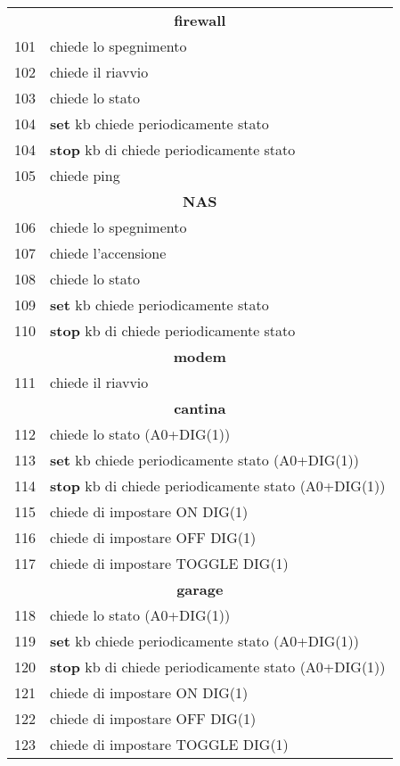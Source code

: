 \documentclass{article}
\begin{document}
    \begin{tabular}{ll}
        \multicolumn{2}{c}{\textbf{firewall}}\\
        101 & chiede lo spegnimento\\
        102 & chiede il riavvio\\
        103 & chiede lo stato\\
        104 & \textbf{set} kb chiede periodicamente stato\\
        104 & \textbf{stop} kb di chiede periodicamente stato\\
        105 & chiede ping\\
        \multicolumn{2}{c}{\textbf{NAS}}\\
        106 & chiede lo spegnimento\\
        107 & chiede l'accensione\\
        108 & chiede lo stato\\
        109 & \textbf{set} kb chiede periodicamente stato\\
        110 & \textbf{stop} kb di chiede periodicamente stato\\
        \multicolumn{2}{c}{\textbf{modem}}\\
        111 & chiede il riavvio\\
        \multicolumn{2}{c}{\textbf{cantina}}\\
        112 & chiede lo stato (A0+DIG(1))\\
        113 & \textbf{set} kb chiede periodicamente stato (A0+DIG(1))\\
        114 & \textbf{stop} kb di chiede periodicamente stato (A0+DIG(1))\\
        115 & chiede di impostare ON DIG(1)     \\
        116 & chiede di impostare OFF DIG(1)    \\
        117 & chiede di impostare TOGGLE DIG(1) \\
        \multicolumn{2}{c}{\textbf{garage}}\\
        118 & chiede lo stato (A0+DIG(1))\\
        119 & \textbf{set} kb chiede periodicamente stato (A0+DIG(1))\\
        120 & \textbf{stop} kb di chiede periodicamente stato (A0+DIG(1))\\
        121 & chiede di impostare ON DIG(1)     \\
        122 & chiede di impostare OFF DIG(1)    \\
        123 & chiede di impostare TOGGLE DIG(1) \\        

\end{tabular}
\end{document}
